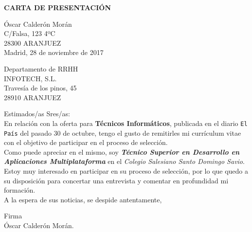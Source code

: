\documentclass[10pt,a4paper]{article}
\begin{document}
\begin{center}
\LARGE \bf CARTA DE PRESENTACIÓN
\end{center}
\vspace{1cm}
\begin{flushright}
Óscar Calderón Morán \\
C/Falsa, 123 4ºC \\
28300 ARANJUEZ \\
\bigskip
Madrid, 28 de noviembre de 2017
\end{flushright}
\medskip
\begin{flushleft}
Departamento de RRHH \\
INFOTECH, S.L. \\
Travesía de los pinos, 45 \\
28910 ARANJUEZ
\end{flushleft}
\vspace{1cm}
\begin{flushleft}
Estimados/as Sres/as: \\
\bigskip
En relación con la oferta para {\bf Técnicos Informáticos}, publicada en el diario {\tt El País} del pasado 30 de octubre, tengo el gusto de remitirles mi currículum vitae con el objetivo de participar en el proceso de selección. \\ \bigskip
Como puede apreciar en el mismo, soy {\bf\em Técnico Superior en Desarrollo en Aplicaciones Multiplataforma} en el {\em Colegio Salesiano Santo Domingo Savio}. \\ \bigskip
Estoy muy interesado en participar en su proceso de selección, por lo que quedo a su disposición para concertar una entrevista y comentar en profundidad mi formación. \\ \bigskip
A la espera de sus noticias, se despide antentamente, \\ 
\end{flushleft}
\bigskip
\begin{center}
Firma\\ \vspace{3cm}
Óscar Calderón Morán. \\
\end{center}
\end{document}
